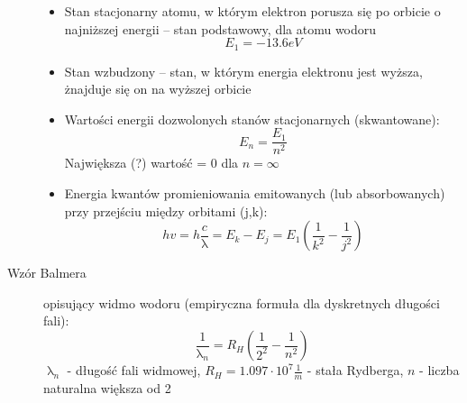 \documentclass[a4paper,11pt]{article}
\begin{document}
\begin{description}
  \begin {itemize}
  \item Stan stacjonarny atomu, w którym elektron porusza się po orbicie o najniższej energii -- stan podstawowy, dla atomu wodoru
    $$E_1 = -13.6eV$$
  \item Stan wzbudzony -- stan, w którym energia elektronu jest wyższa, żnajduje się on na wyższej orbicie
  \item Wartości energii dozwolonych stanów stacjonarnych (skwantowane):
    $$E_n = \frac{E_1}{n^2}$$
    Największa (?) wartość = 0 dla $n=\infty$
  \item Energia kwantów promieniowania emitowanych (lub absorbowanych) przy przejściu między orbitami (j,k):
    $$hv=h\frac{c}{\uplambda}=E_k-E_j=E_1\left(\frac{1}{k^2}-\frac{1}{j^2}\right)$$
  \end{itemize}
\item[Wzór Balmera] opisujący widmo wodoru (empiryczna formuła dla dyskretnych długości fali):
  $$\frac{1}{\uplambda_n}=R_H\left(\frac{1}{2^2}-\frac{1}{n^2}\right)$$
  $\uplambda_n$ - długość fali widmowej, $R_H = 1.097\cdot10^7\frac{1}{m}$ - stała Rydberga, $n$ - liczba naturalna większa od 2


\end{description}
\end{document}
